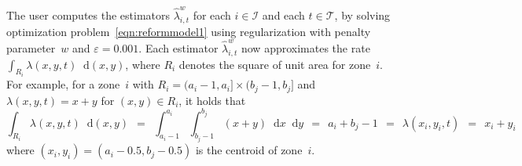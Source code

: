 \documentclass[article]{jss}
\def\diff{\mathop{}\!\mathrm{d}}
\begin{document}
The user computes the estimators $\hat{\lambda}^{w}_{i,t}$ for each $i \in \mathcal{I}$ and each $t \in \mathcal{T}$, by solving optimization problem~\eqref{eqn:reformmodel1} using regularization with penalty parameter~$w$ and $\varepsilon = 0.001$.
Each estimator $\hat{\lambda}^{w}_{i,t}$ now approximates the rate $\displaystyle \int_{R_{i}} \lambda(x,y,t) \diff(x,y)$, where $R_{i}$ denotes the square of unit area for zone~$i$.
For example, for a zone~$i$ with $R_{i} = (a_{i} - 1, a_{i}] \times (b_{j} - 1, b_{j}]$ and $\lambda(x,y,t) = x+y$ for $(x,y) \in R_{i}$, it holds that
\[
\int_{R_{i}} \lambda(x,y,t) \diff(x,y)
\ \ = \ \ \int_{a_{i} - 1}^{a_{i}} \int_{b_{j} - 1}^{b_{j}} (x+y) \diff x \diff y
\ \ = \ \ a_{i} + b_{j} - 1
\ \ = \ \ \lambda(x_{i},y_{i},t)
\ \ = \ \ x_{i} + y_{i}
\]
where $(x_{i},y_{i}) = (a_{i} - 0.5, b_{j} - 0.5)$ is the centroid of zone~$i$.
\end{document}
